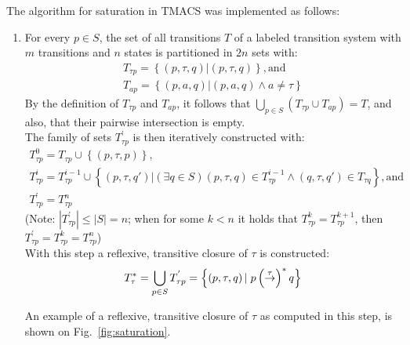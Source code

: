 The algorithm for saturation in TMACS was implemented as follows: 
\begin{enumerate}
\item For every ${p\in \mathit{S}}$, the set of all transitions $T$ of a labeled transition system with $m$ transitions and $n$ states is partitioned in ${2n}$ sets with: 
\begin{equation*}
	\begin{array}{lcl}
 		{T_{\mathit{\tau p}}=\left\{\left(p,\tau,q\right)| \left(p,\tau,q\right)\right\}}, \text{and}\\
    {T_{ap}=\left\{\left(p,a,q\right)| \left(p,a,q\right)\wedge a\neq\tau\right\}}
  \end{array}
\end{equation*} 
By the definition of ${T_{\mathit{\tau p}}}$ and ${T_{ap}}$, it follows that ${\bigcup_{p\in \mathit{S}}\left(T_{\mathit{\tau p}}\cup T_{ap}\right)=T}$, and also, that their pairwise intersection is empty. \\
The family of sets ${T^{'}_{\tau p}}$ is then iteratively constructed with:
\begin{equation*}
	\begin{array}{lcl}
		{T^{0}_{\mathit{\tau p}}=T_{\mathit{\tau p}}\cup\left\{\left(p,\tau,p\right)\right\}},\\
		{T^{i}_{\mathit{\tau p}}=T^{i-1}_{\mathit{\tau p}}\cup\left\{\left(p,\tau,q'\right)|\left(\exists q\in \mathit{S}\right)\left(p,\tau,q\right)\in T^{i-1}_{\mathit{\tau p}}\wedge\left(q,\tau,q'\right)\in T_{\mathit{\tau q}}\right\}}, \text{and} \\
		{T^{'}_{\mathit{\tau p}}=T^{n}_{\mathit{\tau p}}}
	\end{array}
\end{equation*}
(Note: ${\left|T^{'}_{\mathit{\tau p}}\right|\leq\left|\mathit{S}\right|=n}$; when for some ${k<n}$ it holds that ${T^{k}_{\mathit{\tau p}}=T^{k+1}_{\mathit{\tau p}}}$, then ${T^{'}_{\mathit{\tau p}}=T^{k}_{\mathit{\tau p}}=T^{n}_{\mathit{\tau p}}}$)\\

With this step a reflexive, transitive closure of $\tau$ is constructed:
\begin{equation*}
	{T^{*}_{\tau}=\bigcup_{p\in \mathit{S}}T^{'}_{\tau p}=\left\{\left(p,\tau,q\right)|\hspace{1mm}p\left(\stackrel{\tau}{\rightarrow}\right)^{*}q\right\}}
\end{equation*}

An example of a reflexive, transitive closure of $\tau$ as computed in this step, is shown on Fig.~\ref{fig:saturation}.\\


\end{enumerate}
